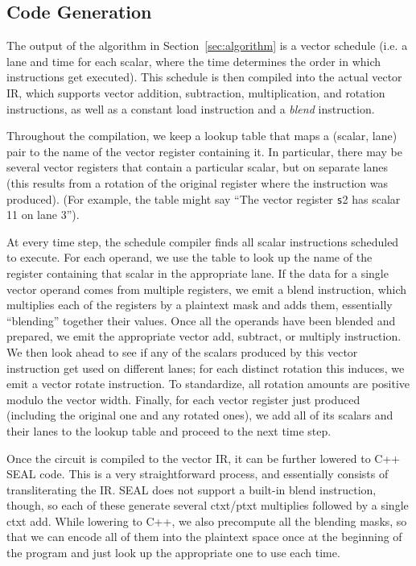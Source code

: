 \subsection{Code Generation}
The output of the algorithm in Section~\ref{sec:algorithm} is a vector schedule (i.e. a lane and time for each scalar, where the time determines the order in which instructions get executed). 
This schedule is then compiled into the actual vector IR, which supports vector addition, subtraction, multiplication, and rotation instructions, as well as a constant load instruction and a {\em blend} instruction.

Throughout the compilation, we keep a lookup table that maps a (scalar, lane) pair to the name of the vector register containing it.
In particular, there may be several vector registers that contain a particular scalar, but on separate lanes (this results from a rotation of the original register where the instruction was produced).
(For example, the table might say ``The vector register {\texttt s2} has scalar 11 on lane 3'').

At every time step, the schedule compiler finds all scalar instructions scheduled to execute.
For each operand, we use the table to look up the name of the register containing that scalar in the appropriate lane.
If the data for a single vector operand comes from multiple registers, we emit a blend instruction, which multiplies each of the registers by a plaintext mask and adds them, essentially ``blending'' together their values.
Once all the operands have been blended and prepared, we emit the appropriate vector add, subtract, or multiply instruction.
We then look ahead to see if any of the scalars produced by this vector instruction get used on different lanes; for each distinct rotation this induces, we emit a vector rotate instruction.
To standardize, all rotation amounts are positive modulo the vector width.
Finally, for each vector register just produced (including the original one and any rotated ones), we add all of its scalars and their lanes to the lookup table and proceed to the next time step.

Once the circuit is compiled to the vector IR, it can be further lowered to C++ SEAL code.
This is a very straightforward process, and essentially consists of transliterating the IR. 
SEAL does not support a built-in blend instruction, though, so each of these generate several ctxt/ptxt multiplies followed by a single ctxt add.
While lowering to C++, we also precompute all the blending masks, so that we can encode all of them into the plaintext space once at the beginning of the program and just look up the appropriate one to use each time.


